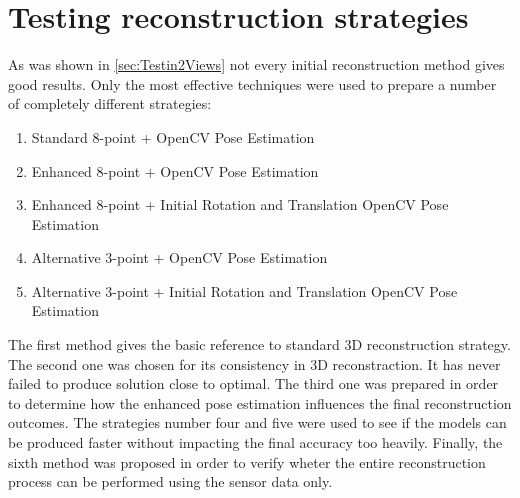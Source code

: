 \section{Testing reconstruction strategies}
As was shown in \ref{sec:Testin2Views} not every initial reconstruction method gives good results. Only the most effective techniques were used to prepare a number of completely different strategies:
\begin{enumerate}
\item \textnormal{Standard 8-point + OpenCV Pose Estimation} 
\item \textnormal{Enhanced 8-point + OpenCV Pose Estimation} 
\item \textnormal{Enhanced 8-point + Initial Rotation and Translation OpenCV Pose Estimation} 
\item \textnormal{Alternative 3-point + OpenCV Pose Estimation}
\item \textnormal{Alternative 3-point + Initial Rotation and Translation OpenCV Pose Estimation}
\end{enumerate}
The first method gives the basic reference to standard 3D reconstruction strategy. The second one was chosen for its consistency in 3D reconstraction. It has never failed to produce solution close to optimal. The third one was prepared in order to determine how the enhanced pose estimation influences the final reconstruction outcomes. The strategies number four and five were used to see if the models can be produced faster without impacting the final accuracy too heavily. Finally, the sixth method was proposed in order to verify wheter the entire reconstruction process can be performed using the sensor data only.


